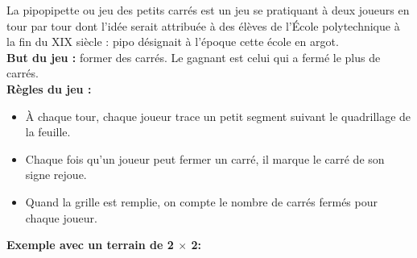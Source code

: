 \enigme[La pipopipette]
      La pipopipette ou \og jeu des petits carrés \fg{} est un jeu se pratiquant à deux joueurs en tour par tour dont l'idée serait attribuée à des élèves de l'École polytechnique à la fin du {\small XIX} siècle : pipo désignait à l'époque cette école en argot. \\
      {\bf But du jeu :} former des carrés. Le gagnant est celui qui a fermé le plus de carrés. \\
      {\bf Règles du jeu :}
         \begin{itemize}
            \item À chaque tour, chaque joueur trace un petit segment suivant le quadrillage de la feuille.
            \item Chaque fois qu'un joueur peut fermer un carré, il marque le carré de son signe rejoue.
            \item Quand la grille est remplie, on compte le nombre de carrés fermés pour chaque joueur.
         \medskip
         \end{itemize}
      {\bf Exemple avec un terrain de 2 $\times$ 2:}

